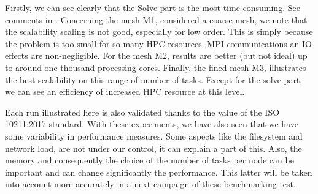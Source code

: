 Firstly, we can see clearly that the Solve part is the most time-consuming. See
comments in .
Concerning the mesh M1, considered a coarse mesh, we note that the
scalability scaling is not good, especially for low order. This is simply because the problem is too small for so many HPC resources. MPI
communications an IO effects are non-negligible.
For the mesh M2, results are better (but not ideal) up to around one thousand processing cores.
Finally, the fined mesh M3, illustrates the best scalability on this range of
number of tasks. Except for the solve part, we can see an efficiency of increased
HPC resource at this level.

Each run illustrated here is also validated thanks to the value of the ISO 10211:2017 standard.
With these experiments, we have also seen that we have some variability in
performance measures. Some aspects like the filesystem and network load, are not
under our control, it can explain a part of this. Also, the memory and
consequently the choice of the number of tasks per node can be important and
can change significantly the performance. This latter will be taken into account
more accurately in a next campaign of these benchmarking test.

\newcommand{\barChart}[2][ybar]{
  \begin{tikzpicture}
    \begin{axis}[
      width=\textwidth, height=0.6172\textwidth,
      xlabel={Number of CPU core}, ylabel={Execution time [s]},
      xtick=data,
      xtick align=outside,
      ymin=0,
      ymajorgrids=true, yminorgrids=true,
      bar width=7pt,
      #1
    ]
    \foreach [expand list=true] \thetuple in {#2} {
      \pgfkeys{/mysettings/.cd,
        table/.store in=\mytable,
        column/.store in=\mycolumn,
        shift/.store in=\myshift, shift/.default=0, shift,
        legend/.store in=\mylegend,
        color/.store in=\mycolor
      }
      \edef\temp{
        \noexpand\pgfkeys{/mysettings/.cd, \expandafter\@firstofone\thetuple}
      } \temp
      \edef\temp{
        \noexpand\addplot[ybar, bar width=0.2, fill=\mycolor, draw=black, point meta=y]
        table [x expr=\noexpand\coordindex+\myshift, y=\mycolumn ] {\expandafter\noexpand\csname \mytable\endcsname};
      } \temp
      \edef\temp{
        \noexpand\addlegendentry{\mylegend}
      } \temp
    }
    \end{axis}
\end{tikzpicture}
}


